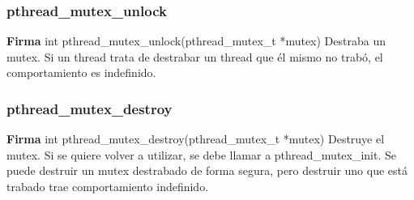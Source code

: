 \documentclass[oneside]{article}
\begin{document}
			\subsubsection{pthread\_mutex\_unlock}
			\textbf{Firma} int pthread\_mutex\_unlock(pthread\_mutex\_t *mutex)
			Destraba un mutex. Si un thread trata de destrabar un thread que él mismo no trabó, el comportamiento es indefinido.

			\subsubsection{pthread\_mutex\_destroy}
			\textbf{Firma} int pthread\_mutex\_destroy(pthread\_mutex\_t *mutex)
			Destruye el mutex. Si se quiere volver a utilizar, se debe llamar a pthread\_mutex\_init. Se puede destruir un mutex destrabado de forma segura, pero destruir uno que está trabado trae comportamiento indefinido.
\end{document}
